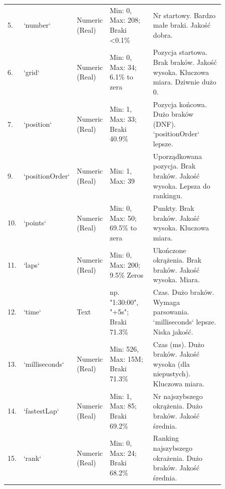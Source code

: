 \documentclass[a4paper,12pt]{article}
\begin{document}
\begin{longtable}{|p{0.03\linewidth}|p{0.17\linewidth}|p{0.13\linewidth}|p{0.2\linewidth}|p{0.33\linewidth}|}
  \tiny 5.          & \tiny `number`          & \tiny Numeric (Real)     & \tiny Min: 0, Max: 208; Braki <0.1\%     & \tiny Nr startowy. Bardzo małe braki. Jakość dobra.                                                     \\
  \tiny 6.          & \tiny `grid`            & \tiny Numeric (Real)     & \tiny Min: 0, Max: 34; 6.1\% to zera     & \tiny Pozycja startowa. Brak braków. Jakość wysoka. Kluczowa miara. Dziwnie dużo 0.                     \\
  \tiny 7.          & \tiny `position`        & \tiny Numeric (Real)     & \tiny Min: 1, Max: 33; Braki 40.9\%      & \tiny Pozycja końcowa. Dużo braków (DNF). `positionOrder` lepsze.                                       \\
  \tiny 9.          & \tiny `positionOrder`   & \tiny Numeric (Real)     & \tiny Min: 1, Max: 39                    & \tiny Uporządkowana pozycja. Brak braków. Jakość wysoka. Lepsza do rankingu.                            \\
  \tiny 10.         & \tiny `points`          & \tiny Numeric (Real)     & \tiny Min: 0, Max: 50; 69.5\% to zera    & \tiny Punkty. Brak braków. Jakość wysoka. Kluczowa miara.                                               \\
  \tiny 11.         & \tiny `laps`            & \tiny Numeric (Real)     & \tiny Min: 0, Max: 200; 9.5\% Zeros      & \tiny Ukończone okrążenia. Brak braków. Jakość wysoka. Miara.                                           \\
  \tiny 12.         & \tiny `time`            & \tiny Text               & \tiny np. "1:30:00", "+5s"; Braki 71.3\% & \tiny Czas. Dużo braków. Wymaga parsowania. `milliseconds` lepsze. Niska jakość.                        \\
  \tiny 13.         & \tiny `milliseconds`    & \tiny Numeric (Real)     & \tiny Min: 526, Max: 15M; Braki 71.3\%   & \tiny Czas (ms). Dużo braków. Jakość wysoka (dla niepustych). Kluczowa miara.                           \\
  \tiny 14.         & \tiny `fastestLap`      & \tiny Numeric (Real)     & \tiny Min: 1, Max: 85; Braki 69.2\%      & \tiny Nr najszybszego okrążenia. Dużo braków. Jakość średnia.                                           \\
  \tiny 15.         & \tiny `rank`            & \tiny Numeric (Real)     & \tiny Min: 0, Max: 24; Braki 68.2\%      & \tiny Ranking najszybszego okrażenia. Dużo braków. Jakość średnia.                                      \\

\end{longtable}
\end{document}
